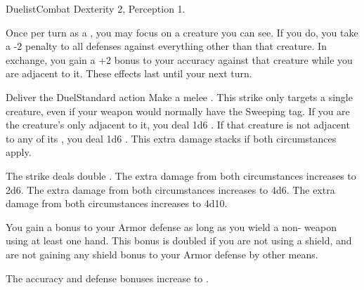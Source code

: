   \begin{feat}{Duelist}{Combat}
    \featpre Dexterity 2, Perception 1.

     Once per turn as a , you may focus on a creature you can see. If you do, you take a -2 penalty to all defenses against everything other than that creature. In exchange, you gain a +2 bonus to your accuracy against that creature while you are adjacent to it. These effects last until your next turn.

    \begin{activeability}{Deliver the Duel}{Standard action}
      \rankline
      Make a melee .
      This strike only targets a single creature, even if your weapon would normally have the Sweeping tag.
      If you are the creature's only  adjacent to it, you deal 1d6 .
      If that creature is not adjacent to any of its , you deal 1d6 .
      This extra damage stacks if both circumstances apply.

      \rankline
       The strike deals double .
       The extra damage from both circumstances increases to 2d6.
       The extra damage from both circumstances increases to 4d6.
       The extra damage from both circumstances increases to 4d10.
    \end{activeability}

     You gain a  bonus to your Armor defense as long as you wield a non- weapon using at least one hand.
    This bonus is doubled if you are not using a shield, and are not gaining any shield bonus to your Armor defense by other means.

     The accuracy and defense bonuses increase to .
  \end{feat}

